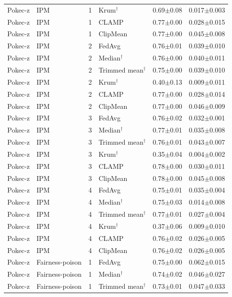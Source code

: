 \begin{longtable}{llclcc}
Pokec-z & IPM & 1 & Krum$^\dagger$ & 0.69$\pm$0.08 & 0.017$\pm$0.003 \\
Pokec-z & IPM & 1 & CLAMP & 0.77$\pm$0.00 & 0.028$\pm$0.015 \\
Pokec-z & IPM & 1 & ClipMean & 0.77$\pm$0.00 & 0.045$\pm$0.008 \\
Pokec-z & IPM & 2 & FedAvg & 0.76$\pm$0.01 & 0.039$\pm$0.010 \\
Pokec-z & IPM & 2 & Median$^\dagger$ & 0.76$\pm$0.00 & 0.040$\pm$0.011 \\
Pokec-z & IPM & 2 & Trimmed mean$^\dagger$ & 0.75$\pm$0.00 & 0.039$\pm$0.010 \\
Pokec-z & IPM & 2 & Krum$^\dagger$ & 0.40$\pm$0.13 & 0.009$\pm$0.011 \\
Pokec-z & IPM & 2 & CLAMP & 0.77$\pm$0.00 & 0.028$\pm$0.014 \\
Pokec-z & IPM & 2 & ClipMean & 0.77$\pm$0.00 & 0.046$\pm$0.009 \\
Pokec-z & IPM & 3 & FedAvg & 0.76$\pm$0.02 & 0.032$\pm$0.001 \\
Pokec-z & IPM & 3 & Median$^\dagger$ & 0.77$\pm$0.01 & 0.035$\pm$0.008 \\
Pokec-z & IPM & 3 & Trimmed mean$^\dagger$ & 0.76$\pm$0.01 & 0.043$\pm$0.007 \\
Pokec-z & IPM & 3 & Krum$^\dagger$ & 0.35$\pm$0.04 & 0.004$\pm$0.002 \\
Pokec-z & IPM & 3 & CLAMP & 0.78$\pm$0.00 & 0.030$\pm$0.011 \\
Pokec-z & IPM & 3 & ClipMean & 0.78$\pm$0.00 & 0.045$\pm$0.008 \\
Pokec-z & IPM & 4 & FedAvg & 0.75$\pm$0.01 & 0.035$\pm$0.004 \\
Pokec-z & IPM & 4 & Median$^\dagger$ & 0.75$\pm$0.03 & 0.014$\pm$0.008 \\
Pokec-z & IPM & 4 & Trimmed mean$^\dagger$ & 0.77$\pm$0.01 & 0.027$\pm$0.004 \\
Pokec-z & IPM & 4 & Krum$^\dagger$ & 0.37$\pm$0.06 & 0.009$\pm$0.010 \\
Pokec-z & IPM & 4 & CLAMP & 0.76$\pm$0.02 & 0.026$\pm$0.005 \\
Pokec-z & IPM & 4 & ClipMean & 0.76$\pm$0.02 & 0.026$\pm$0.005 \\
Pokec-z & Fairness-poison & 1 & FedAvg & 0.75$\pm$0.00 & 0.062$\pm$0.015 \\
Pokec-z & Fairness-poison & 1 & Median$^\dagger$ & 0.74$\pm$0.02 & 0.046$\pm$0.027 \\
Pokec-z & Fairness-poison & 1 & Trimmed mean$^\dagger$ & 0.73$\pm$0.01 & 0.047$\pm$0.033 \\

\end{longtable}
